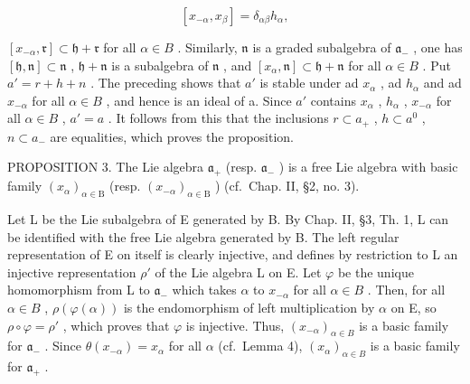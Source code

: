 \[
[ x _ {- \alpha}, x _ {\beta} ] = \delta_ {\alpha \beta} h _ {\alpha},
\]

\([x_{-\alpha}, \mathfrak{r}] \subset \mathfrak{h} + \mathfrak{r}\) for all \(\alpha \in B\) . Similarly, \(\mathfrak{n}\) is a graded subalgebra of \(\mathfrak{a}_{-}\) , one has \([\mathfrak{h}, \mathfrak{n}] \subset \mathfrak{n}\) , \(\mathfrak{h} + \mathfrak{n}\) is a subalgebra of \(\mathfrak{n}\) , and \([x_{\alpha}, \mathfrak{n}] \subset \mathfrak{h} + \mathfrak{n}\) for all \(\alpha \in B\) . Put \(a' = r + h + n\) . The preceding shows that \(a'\) is stable under ad \(x_{\alpha}\) , ad \(h_{\alpha}\) and ad \(x_{-\alpha}\) for all \(\alpha \in B\) , and hence is an ideal of a. Since \(a'\) contains \(x_{\alpha}\) , \(h_{\alpha}\) , \(x_{-\alpha}\) for all \(\alpha \in B\) , \(a' = a\) . It follows from this that the inclusions \(r \subset a_{+}\) , \(h \subset a^{0}\) , \(n \subset a_{-}\) are equalities, which proves the proposition.

PROPOSITION 3. The Lie algebra \(\mathfrak{a}_{+}\) (resp. \(\mathfrak{a}_{-}\) ) is a free Lie algebra with basic family \((x_{\alpha})_{\alpha \in \mathrm{B}}\) (resp. \((x_{-\alpha})_{\alpha \in \mathrm{B}}\) ) (cf.~Chap. II, §2, no. 3).

Let L be the Lie subalgebra of E generated by B. By Chap. II, §3, Th. 1, L can be identified with the free Lie algebra generated by B. The left regular representation of E on itself is clearly injective, and defines by restriction to L an injective representation \(\rho'\) of the Lie algebra L on E. Let \(\varphi\) be the unique homomorphism from L to \(\mathfrak{a}_{-}\) which takes \(\alpha\) to \(x_{-\alpha}\) for all \(\alpha \in B\) . Then, for all \(\alpha \in B\) , \(\rho(\varphi(\alpha))\) is the endomorphism of left multiplication by \(\alpha\) on E, so \(\rho \circ \varphi = \rho'\) , which proves that \(\varphi\) is injective. Thus, \((x_{-\alpha})_{\alpha \in B}\) is a basic family for \(\mathfrak{a}_{-}\) . Since \(\theta(x_{-\alpha}) = x_{\alpha}\) for all \(\alpha\) (cf.~Lemma 4), \((x_{\alpha})_{\alpha \in B}\) is a basic family for \(\mathfrak{a}_{+}\) .
\relax{}
